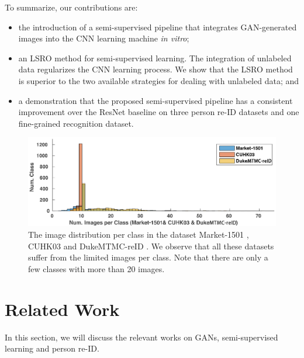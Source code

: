 \documentclass[10pt,twocolumn,letterpaper]{article}
\begin{document}

To summarize, our contributions are:

\begin{itemize}
\item the introduction of a semi-supervised pipeline that integrates GAN-generated images into the CNN learning machine \emph{in vitro};
\item an LSRO method for semi-supervised learning. The integration of unlabeled data regularizes the CNN learning process. We show that the LSRO method is superior to the two available strategies for dealing with unlabeled data; and
\item a demonstration that the proposed semi-supervised pipeline has a consistent improvement over the ResNet baseline on three person re-ID datasets and one fine-grained recognition dataset. 
\end{itemize}

\begin{figure}[t]
\begin{center}
   \includegraphics[width=1.0\linewidth]{class.eps}
\end{center}
\caption{The image distribution per class in the dataset Market-1501 \cite{zheng2015scalable}, CUHK03 \cite{li2014deepreid} and DukeMTMC-reID \cite{ristani2016MTMC}. We observe that all these datasets suffer from the limited images per class. Note that there are only a few classes with more than 20 images.}
\label{fig:class}
\end{figure} 

\section{Related Work}
In this section, we will discuss the relevant works on GANs, semi-supervised learning and person re-ID.
\end{document}
